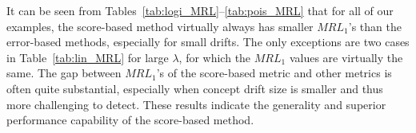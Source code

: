 \documentclass[twoside,11pt]{article}
\begin{document}
\begin{appendices}
It can be seen from Tables~\ref{tab:logi_MRL}--\ref{tab:pois_MRL} that for all of our examples, the score-based method virtually always has smaller $MRL_1$'s than the error-based methods, especially for small drifts. The only exceptions are two cases in Table~\ref{tab:lin_MRL} for large $\lambda$, for which the $MRL_1$ values are virtually the same.
The gap between $MRL_1$'s of the score-based metric and other metrics is often quite substantial, especially when concept drift size is smaller and thus more challenging to detect. These results indicate the generality and superior performance capability of the score-based method.




\end{appendices}
\end{document}
